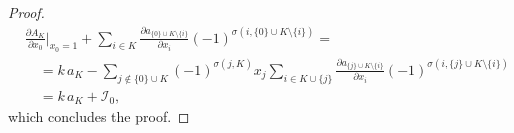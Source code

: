 \documentclass[10pt,a4paper]{amsart}
\newcommand{\cI}{\mathcal{I}}
\begin{document}
\begin{proof}
\begin{align*}
 &\frac{\partial A_{K}}{\partial x_0}\Big|_{x_0= 1} + \sum_{i\in K} \frac{\partial a_{\{0\} \cup K  \setminus \{i\} }}{\partial x_i} (-1)^{\sigma(i,\{0\} \cup K\setminus \{i\})} = \\
  &\quad     = k\, a_K - \sum_{j \not\in \{0\} \cup K}(-1)^{\sigma(j,K)} x_j\sum_{i\in K\cup \{j\}} \frac{\partial a_{\{j\} \cup K\setminus \{i\}}}{\partial x_i}(-1)^{\sigma(i,\{j\}\cup K\setminus \{i\})} \\
&\quad = k\, a_K + \cI_0,
\end{align*}
which concludes the proof.
\end{proof}
\end{document}
